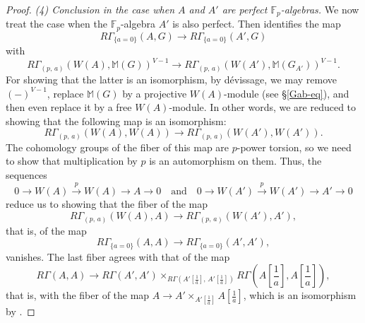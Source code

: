 \documentclass[11pt, reqno]{amsart}
\newcommand{\bF}{\mathbb{F}}
\newcommand{\bM}{\mathbb{M}}
\newcommand{\ra}{\rightarrow}
\newcommand{\xra}{\xrightarrow}
\providecommand{\f}[2]{\frac{#1}{#2}}
\providecommand{\qxq}[1]{\quad\text{#1}\quad}
\newcommand{\tst}{\textstyle}
\numberwithin{equation}{numberingbase}
\theoremstyle{thms}
\theoremstyle{claims}
\theoremstyle{defs}
\theoremstyle{thms}
\theoremstyle{defs}
\theoremstyle{subsection-tweak}
\theoremstyle{subsection-tweak}
\begin{document}
\begin{proof}
\emph{(4) Conclusion in the case when $A$ and $A'$ are perfect  $\bF_p$-algebras.}  
We now treat the case when the $\bF_p$-algebra $A'$ is also perfect. Then %
 identifies the map
\[
R\Gamma_{\{a = 0\}}(A, G) \ra R\Gamma_{\{a = 0\}}(A', G)
\]
with
\[
 R\Gamma_{(p,\, a)}(W(A), \bM(G))^{V - 1} \ra R\Gamma_{(p,\,  a)}(W(A'), \bM(G_{A'}))^{V - 1}.
\]
For showing that the latter is an isomorphism, by d\'{e}vissage, we may remove $(-)^{V - 1}$, replace $\bM(G)$ by a projective $W(A)$-module (see \S\ref{Gab-eq}), %
and then even replace it by a free $W(A)$-module. In other words, we are reduced to showing that the following map  is an isomorphism:
\[
R\Gamma_{(p,\,a)}(W(A), W(A)) \ra R\Gamma_{(p,\, a)}(W(A'), W(A')).
\]
The cohomology groups of the fiber of this map are $p$-power torsion, so we need to show that multiplication by $p$ is an automorphism on them. Thus, the sequences 
\[
0 \ra W(A) \xra{p} W(A) \ra A \ra 0 \qxq{and} 0 \ra W(A') \xra{p} W(A') \ra A' \ra 0
\]
reduce us to showing that the fiber of the map
\[
R\Gamma_{(p,\, a)}(W(A), A) \ra R\Gamma_{(p,\, a)}(W(A'), A'), 
\]
that is, of the map
\[
R\Gamma_{\{ a = 0\}}(A, A) \ra R\Gamma_{\{ a = 0\}}(A', A'),
\]
vanishes. The last fiber agrees with that of the map
\[
\tst R\Gamma(A, A) \ra R\Gamma(A', A') \times_{R\Gamma(A'[\f 1a],\, A'[\f 1a])} R\Gamma(A[\f 1a], A[\f 1a]),
\]
that is, with the fiber of the map $A\ra A' \times_{A'[\f 1a]}A[\f 1a]$, which is an isomorphism by .


\end{proof}
\end{document}

